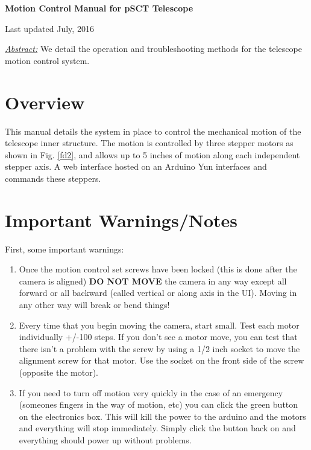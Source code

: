 \documentclass[11pt]{article}
\begin{document}
\begin{center}
{\bf{\huge{Motion Control Manual for pSCT Telescope}}}

\vspace{0.1in}
Last updated July, 2016

\vspace{0.3in}
{\it{\underline{Abstract:}}} We detail the operation and troubleshooting methods for the telescope motion control system.

\end{center}

\tableofcontents

\vspace{0.2in}


\section{Overview}

This manual details the system in place to control the mechanical motion of the telescope inner structure.
The motion is controlled by three stepper motors as shown in Fig. \ref{fd2}, and allows up to 5 inches of motion along each independent stepper axis. 
A web interface hosted on an Arduino Yun interfaces and commands these steppers.


\section{Important Warnings/Notes}

First, some important warnings:
\begin{enumerate}
	\item Once the motion control set screws have been locked (this is done after the camera is aligned) {\bf DO NOT MOVE} the camera in any way except all forward or all backward (called vertical or along axis in the UI).
	Moving in any other way will break or bend things!
	\item Every time that you begin moving the camera, start small.  Test each motor individually +/-100 steps.  
		If you don't see a motor move, you can test that there isn't a problem with the screw by using a 1/2 inch socket to move the alignment screw for that motor.
		Use the socket on the front side of the screw (opposite the motor).
	\item If you need to turn off motion very quickly in the case of an emergency (someones fingers in the way of motion, etc) you can click the green button on the electronics box.
		 This will kill the power to the arduino and the motors and everything will stop immediately.
		 Simply click the button back on and everything should power up without problems.
\end{enumerate}
\end{document}
